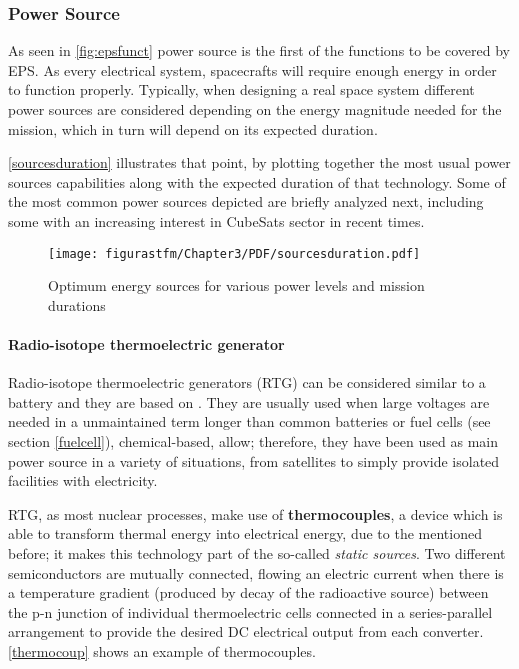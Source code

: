 \subsubsection{Power Source}

As seen in \autoref{fig:epsfunct} power source is the first of the functions to be covered by \acrshort{EPS}. As every electrical system, spacecrafts will require enough energy in order to function properly. Typically, when designing a real space system different power sources are considered depending on the energy magnitude needed for the mission, which in turn will depend on its expected duration. 

\autoref{sourcesduration} illustrates that point, by plotting together the most usual power sources capabilities along with the expected duration of that technology. Some of the most common power sources depicted are briefly analyzed next, including some with an increasing interest in CubeSats sector in recent times.

			\begin{figure} [h] 
				\centering
				\texttt{[image: figurastfm/Chapter3/PDF/sourcesduration.pdf]}
				\caption{Optimum energy sources for various power levels and mission durations \cite{spacecraftspower}}
				\label{sourcesduration}
			\end{figure}


\paragraph{Radio-isotope thermoelectric generator} 
\label{rtg}


Radio-isotope thermoelectric generators (\acrshort{RTG}) can be considered similar to a battery and they are based on . They are usually used when large voltages are needed in a unmaintained term longer than common batteries or fuel cells (see section \ref{fuelcell}), chemical-based, allow; therefore, they have been used as main power source in a variety of situations, from satellites to simply provide isolated facilities with electricity.

\acrshort{RTG}, as most nuclear processes, make use of \textbf{thermocouples}, a device which is able to transform thermal energy into electrical energy, due to the  mentioned before; it makes this technology part of the so-called \textit{static sources}. Two different semiconductors are mutually connected, flowing an electric current when there is a temperature gradient (produced by decay of the radioactive source)  between the p-n junction of individual thermoelectric cells connected in a series-parallel arrangement to provide the desired DC electrical output from each converter. \autoref{thermocoup} shows an example of thermocouples.

